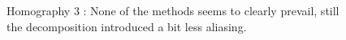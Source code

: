 

\begin{figure}
\caption{Homography 3 : None of the methods seems to clearly prevail, still the decomposition introduced a bit less aliasing.}
\label{Homo3}
\end{figure}


